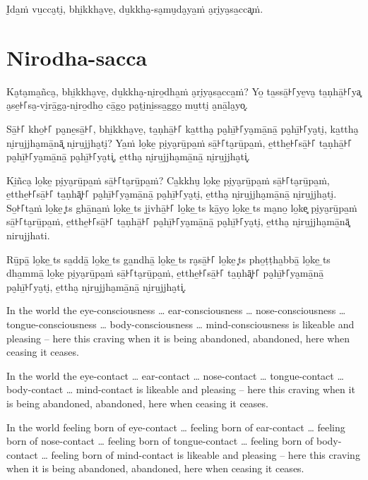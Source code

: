 I̮da̱ṁ vu̱cca̮ti̮, bhi̱kkha̮ve̱, du̱kkha̮-sa̮mu̮da̮ya̱ṁ a̮ri̮ya̮sa̱cca͓ṁ.

\section*{Nirodha-sacca}

Ka̮ta̮ma̱ñca̮, bhi̱kkha̮ve̱, du̱kkha̮-ni̮ro̱dha̱ṁ a̮ri̮ya̮sa̱cca̱ṁ? Yo̱ ta̱ssā̱꜔꜒ye̱va̮ ta̱ṇhā̱꜔꜒ya͓
a̮se̱꜔꜒sa̮-vi̮rā̱ga̮-ni̮ro̱dho̱ cā̱go̱ pa̮ṭi̮ni̱ssa̱ggo̱ mu̱tti̮ a̮nā̱la̮yo͓.

Sā̱꜔꜒ kho̱꜔꜒ pa̮ne̱sā̱꜔꜒, bhi̱kkha̮ve̱, ta̱ṇhā̱꜔꜒ ka̱ttha̮ pa̮hī̱꜔꜒ya̮mā̱nā̱ pa̮hī̱꜔꜒ya̮ti̮, ka̱ttha̮ ni̮ru̱jjha̮mā̱nā͓
ni̮ru̱jjha̮ti̮? Ya̱ṁ lo̱ke̱ pi̮ya̮rū̱pa̱ṁ sā̱꜔꜒ta̮rū̱pa̱ṁ, e̱tthe̱꜔꜒sā̱꜔꜒ ta̱ṇhā̱꜔꜒ pa̮hī̱꜔꜒ya̮mā̱nā̱ pa̮hī̱꜔꜒ya̮ti͓,
e̱ttha̮ ni̮ru̱jjha̮mā̱nā̱ ni̮ru̱jjha̮ti͓.

Ki̱ñca̮ lo̱ke̱ pi̮ya̮rū̱pa̱ṁ sā̱꜔꜒ta̮rū̱pa̱ṁ? Ca̱kkhu̮ lo̱ke̱ pi̮ya̮rū̱pa̱ṁ sā̱꜔꜒ta̮rū̱pa̱ṁ, e̱tthe̱꜔꜒sā̱꜔꜒ ta̱ṇhā͓꜔꜒
pa̮hī̱꜔꜒ya̮mā̱nā̱ pa̮hī̱꜔꜒ya̮ti̮, e̱ttha̮ ni̮ru̱jjha̮mā̱nā̱ ni̮ru̱jjha̮ti̮. So̱꜔꜒ta̱ṁ lo̱ke̱ \ldo͓ts{}
ghā̱na̱ṁ lo̱ke̱ \ldo̱ts{} ji̱vhā̱꜔꜒ lo̱ke̱ \ldo̱ts{} kā̱yo̱ lo̱ke̱ \ldo̱ts{} ma̮no̱ lo̱ke͓
pi̮ya̮rū̱pa̱ṁ sā̱꜔꜒ta̮rū̱pa̱ṁ, e̱tthe̱꜔꜒sā̱꜔꜒ ta̱ṇhā̱꜔꜒ pa̮hī̱꜔꜒ya̮mā̱nā̱ pa̮hī̱꜔꜒ya̮ti̮, e̱ttha̮ ni̮ru̱jjha̮mā̱nā͓
nirujjhati.

Rū̱pā̱ lo̱ke̱ \ldo̱ts{} sa̱ddā̱ lo̱ke̱ \ldo̱ts{} ga̱ndhā̱ lo̱ke̱ \ldo̱ts{} ra̮sā̱꜔꜒ lo̱ke̱ \ldo͓ts{}
pho̱ṭṭha̱bbā̱ lo̱ke̱ \ldo̱ts{} dha̱mmā̱ lo̱ke̱ pi̮ya̮rū̱pa̱ṁ sā̱꜔꜒ta̮rū̱pa̱ṁ, e̱tthe̱꜔꜒sā̱꜔꜒ ta̱ṇhā͓꜔꜒
pa̮hī̱꜔꜒ya̮mā̱nā̱ pa̮hī̱꜔꜒ya̮ti̮, e̱ttha̮ ni̮ru̱jjha̮mā̱nā̱ ni̮ru̱jjha̮ti͓.

\englishPage

In the world the eye-consciousness \ldots{} ear-consciousness \ldots{}
nose-consciousness \ldots{} tongue-consciousness \ldots{} body-consciousness
\ldots{} mind-consciousness is likeable and pleasing -- here this craving when
it is being abandoned, abandoned, here when ceasing it ceases.

In the world the eye-contact \ldots{} ear-contact \ldots{} nose-contact \ldots{}
tongue-contact \ldots{} body-contact \ldots{} mind-contact is likeable and
pleasing -- here this craving when it is being abandoned, abandoned, here when
ceasing it ceases.

In the world feeling born of eye-contact \ldots{} feeling born of ear-contact
\ldots{} feeling born of nose-contact \ldots{} feeling born of tongue-contact
\ldots{} feeling born of body-contact \ldots{} feeling born of mind-contact is
likeable and pleasing -- here this craving when it is being abandoned, abandoned,
here when ceasing it ceases.

